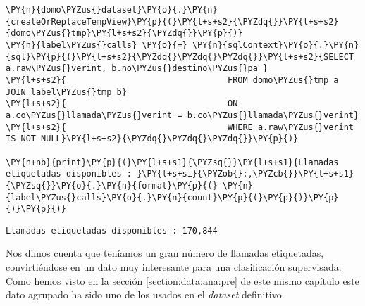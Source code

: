 \vspace{0.5cm}
    \begin{tcolorbox}[breakable, size=fbox, boxrule=1pt, pad at break*=1mm,colback=cellbackground, colframe=cellborder]
\begin{Verbatim}[commandchars=\\\{\}]
\PY{n}{domo\PYZus{}dataset}\PY{o}{.}\PY{n}{createOrReplaceTempView}\PY{p}{(}\PY{l+s+s2}{\PYZdq{}}\PY{l+s+s2}{domo\PYZus{}tmp}\PY{l+s+s2}{\PYZdq{}}\PY{p}{)}
\PY{n}{label\PYZus{}calls} \PY{o}{=} \PY{n}{sqlContext}\PY{o}{.}\PY{n}{sql}\PY{p}{(}\PY{l+s+s2}{\PYZdq{}\PYZdq{}\PYZdq{}}\PY{l+s+s2}{SELECT a.raw\PYZus{}verint, b.no\PYZus{}destino\PYZus{}pa }
\PY{l+s+s2}{                                FROM domo\PYZus{}tmp a JOIN label\PYZus{}tmp b}
\PY{l+s+s2}{                                ON a.co\PYZus{}llamada\PYZus{}verint = b.co\PYZus{}llamada\PYZus{}verint}
\PY{l+s+s2}{                                WHERE a.raw\PYZus{}verint IS NOT NULL}\PY{l+s+s2}{\PYZdq{}\PYZdq{}\PYZdq{}}\PY{p}{)}

\PY{n+nb}{print}\PY{p}{(}\PY{l+s+s1}{\PYZsq{}}\PY{l+s+s1}{Llamadas etiquetadas disponibles : }\PY{l+s+si}{\PYZob{}:,\PYZcb{}}\PY{l+s+s1}{\PYZsq{}}\PY{o}{.}\PY{n}{format}\PY{p}{(} \PY{n}{label\PYZus{}calls}\PY{o}{.}\PY{n}{count}\PY{p}{(}\PY{p}{)}\PY{p}{)}\PY{p}{)}  
\end{Verbatim}
\end{tcolorbox}

    \begin{Verbatim}[commandchars=\\\{\}]
Llamadas etiquetadas disponibles : 170,844
    \end{Verbatim}

 Nos dimos cuenta que teníamos un gran número de llamadas etiquetadas, convirtiéndose en un dato muy interesante para una clasificación supervisada. Como hemos visto en la sección \ref{section:data:ana:pre} de este mismo capítulo este dato agrupado ha sido uno de los usados en el \textit{dataset} definitivo.
 
 
 